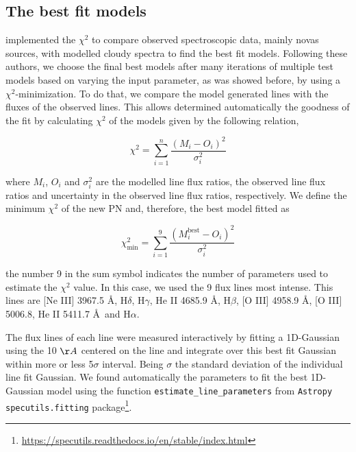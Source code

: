 \documentclass[fleqn,usenatbib]{mnras}
\begin{document}
\subsection{The best fit models}
\label{sec:best-fit}

\citet{Helton:2010, Mondal:2018, Pavana:2019, Mondal:2020, Pandey:2022a, Pandey:2022b}
implemented the $\chi^2$ to compare observed spectroscopic data,
mainly novas sources, with modelled {\sc cloudy} spectra to find the best
fit models. Following these authors, we choose the final best models
after many iterations of multiple test models based on varying the input parameter,
as was showed before, by using a $\chi^2$-minimization.
To do that, we compare the model generated lines with the fluxes of the observed lines.
This allows determined automatically the goodness of the fit by
calculating $\chi^{2}$ of the models given by the following relation,

\begin{equation}
  \chi^{2} = \sum^{n}_{i = 1} \frac{(M_i - O_i)^2}{\sigma^{2}_i}
  \label{eq:chi}
\end{equation}

where $M_i$, $O_i$ and $\sigma^{2}_i$ are the modelled line flux ratios, the observed line flux
ratios and uncertainty in the observed line flux ratios, respectively. We define the minimum
$\chi^{2}$ of the new PN and, therefore, the best model fitted as

\begin{equation}
   \chi^{2}_{\text{min}} = \sum^{9}_{i = 1} \frac{(M^{\text{best}}_i - O_i)^2}{\sigma^{2}_i}
  \label{eq:chi-red}
\end{equation}

the number 9 in the sum symbol indicates the number of parameters used to estimate the $\chi^{2}$
value. In this case, we used the 9 flux lines most intense.
This lines are [Ne III] 3967.5 \AA, H$\delta$, H$\gamma$, He II 4685.9 \AA, H$\beta$, [O III] 4958.9 \AA,
[O III] 5006.8, He II 5411.7 \AA~and H{$\alpha$}.

The flux lines of each line were measured interactively by fitting a 1D-Gaussian using
the 10 $\AA$ centered on the line and integrate over this best fit Gaussian within more
or less 5$\sigma$ interval. Being $\sigma$ the standard deviation of the individual
line fit Gaussian. We found automatically the parameters to fit the best 1D-Gaussian model
using the function \texttt{estimate\_line\_parameters} from \texttt{Astropy specutils.fitting}
package\footnote{\url{https://specutils.readthedocs.io/en/stable/index.html}}.
\end{document}
